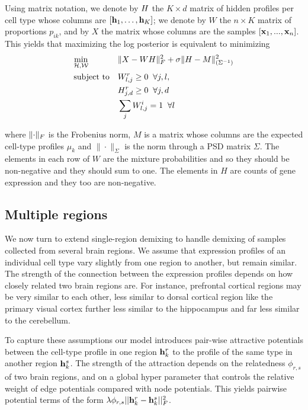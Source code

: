 Using matrix notation, we denote by ${H}$ the $K \times d$ matrix of hidden profiles per cell type whose columns are $\left[{\mathbf{h}_1, \ldots, \mathbf{h}_K}\right]$; we denote by $W$ the $n \times K$ matrix of proportions $p_{ik}$,
and by $X$ the matrix whose columns are the samples $\left[{\mathbf{x}_1,..., \mathbf{x}_n}\right]$. This yields that maximizing the log posterior is equivalent to minimizing 
\begin{equation}
    \label{eq-single}
    \begin{aligned}
        & \underset{\cal{{H}},\cal{W}}{\text{min}}  
        & & \|{X - W {H}}\|_F^2 + \sigma \|{ {H} - M }\|^2_{(\Sigma^{-1})}\\
            & \text{subject to} &
            & W^r_{l,j} \geq 0 \;\; \forall j, l, \\
        & & & H^r_{j,d} \geq 0 \;\;\forall j, d \\
        & & & \sum_j W^i_{l,j} = 1 \;\; \forall l \\
        \end{aligned}
\end{equation}

where $\|{\cdot}\|_F$ is the Frobenius norm, $M$ is a matrix whose columns are the expected cell-type profiles $\mu_k$ and  $\|\cdot\|_{\Sigma}$ is the norm through a PSD matrix $\Sigma$. The elements in each row of $W$ are the mixture probabilities and so they should be non-negative and they should sum to one. The elements in $H$ are counts of gene expression and they too are non-negative.

\subsection{Multiple regions}
We now turn to extend single-region demixing to handle demixing of samples collected from several brain regions. We assume that expression profiles of an individual cell type vary slightly from one region to another, but remain similar. The strength of the connection between the expression profiles depends on how closely related two brain regions are. For instance, prefrontal cortical regions may be very similar to each other, less similar to dorsal cortical region like the primary visual cortex further less similar to the hippocampus and far less similar to the cerebellum. 

To capture these assumptions our model introduces pair-wise attractive potentials between the cell-type profile in one region $\mathbf{h}^r_k$ to the profile of the same type in another region $\mathbf{h}^s_k$. The strength of the attraction depends on the relatedness $\phi_{r,s}$ of two brain regions, and on a global hyper parameter that controls the relative weight of edge potentials compared with node potentials. This yields pairwise potential terms of the form 
$\lambda \phi_{r,s}|| \mathbf{h}^r_k - \mathbf{h}^s_k||^2_F$.

